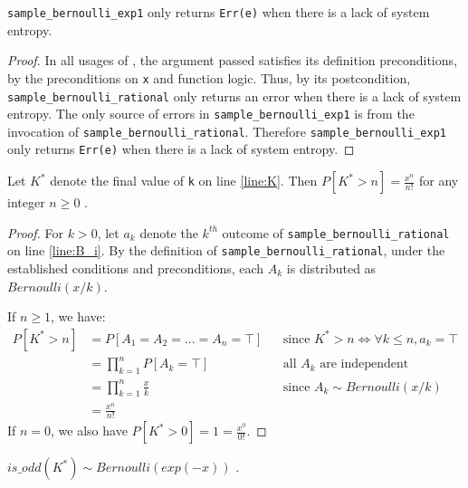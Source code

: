 \documentclass{article}
\begin{document}
\begin{lemma} 
    \label{err-e} 
    \texttt{sample\_bernoulli\_exp1} only returns \texttt{Err(e)} when there is a lack of system entropy. 
\end{lemma} 
 
\begin{proof} 
    In all usages of , the argument passed satisfies its definition preconditions,  
    by the preconditions on \texttt{x} and function logic. 
    Thus, by its postcondition, \texttt{sample\_bernoulli\_rational} only returns an error when there is a lack of system entropy. 
    The only source of errors in \texttt{sample\_bernoulli\_exp1} is from the invocation of \texttt{sample\_bernoulli\_rational}. 
    Therefore \texttt{sample\_bernoulli\_exp1} only returns \texttt{Err(e)} when there is a lack of system entropy. 
\end{proof} 
 
\begin{lemma} 
    \label{P_K_gt_n} 
    Let $K^{*}$ denote the final value of \texttt{k} on line \ref{line:K}. 
    Then $P[K^{*} > n] = \frac{x^n}{n!}$ for any integer $n \ge 0$ \cite{CKS20}. 
\end{lemma} 
 
\begin{proof} 
    For $k  > 0$, let $a_k$ denote the $k^{th}$ outcome of \texttt{sample\_bernoulli\_rational} on line \ref{line:B_i}. 
    By the definition of \texttt{sample\_bernoulli\_rational}, under the established conditions and preconditions, 
    each $A_k$ is distributed as $Bernoulli(x / k)$. 
 
 If $n \ge 1$, we have:
    \begin{align*} 
        P[K^{*} > n] &= P[A_1 = A_2 = ... = A_n = \top] && \text{since } K^{*} > n \iff \forall k \leq n, a_k = \top \\ 
        &= \prod_{k=1}^n P[A_k = \top] && \text{all $A_k$ are independent} \\ 
        &= \prod_{k=1}^n \frac{x}{k} && \text{since $A_k \sim Bernoulli(x/k)$} \\ 
        &= \frac{x^n}{n!}
    \end{align*} 
  If $n = 0$, we also have $P[K^{*} > 0] = 1 = \frac{x^0}{0!}$.
\end{proof} 
 
\begin{lemma} 
    \label{ok-out} 
    $is\_odd(K^{*}) \sim Bernoulli(exp(-x))$ \cite{CKS20}. 
\end{lemma} 
 
\end{document}
